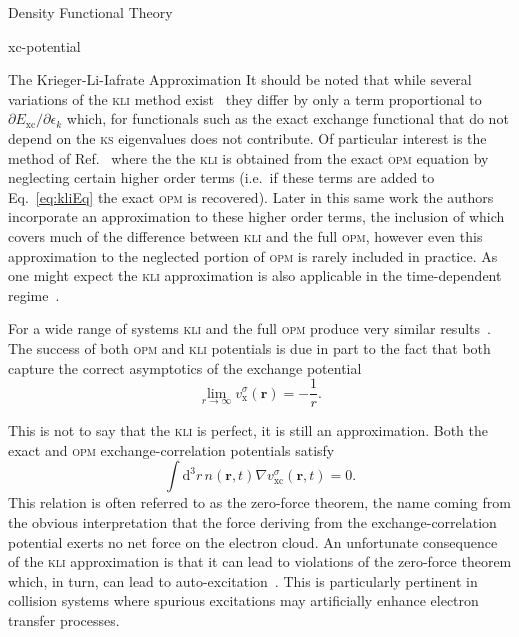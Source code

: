 \documentclass[a5paper, 9 pt]{extreport}
\begin{document}
\begin{chapter}{Density Functional Theory \label{chap:dft}}
\begin{section}{xc-potential \label{sec:xcpot}}
\begin{subsection}{The Krieger-Li-Iafrate Approximation \label{sec:kli}}
         It should be noted that while several variations of the \textsc{kli} method exist~\cite{kli1,
         kli2, kli3} they differ by only a term proportional to $\partial E_\mathrm{xc} / \partial
         \epsilon_k$ which, for functionals such as the exact exchange functional that do not depend on
         the \textsc{ks} eigenvalues does not contribute. Of particular interest is the method of
         Ref.~\cite{kli2} where the the \textsc{kli} is obtained from the exact \textsc{opm} equation by
         neglecting certain higher order terms (i.e.\ if these terms are added to Eq.~\eqref{eq:kliEq}
         the exact \textsc{opm} is recovered). Later in this same work the authors incorporate an
         approximation to these higher order terms, the inclusion of which covers much of the difference
         between \textsc{kli} and the full \textsc{opm}, however even this approximation to the
         neglected portion of \textsc{opm} is rarely included in practice. As one might expect the
         \textsc{kli} approximation is also applicable in the time-dependent regime~\cite{tdkli1,
         tdkli2, tdkli3}.

         For a wide range of systems \textsc{kli} and the full \textsc{opm} produce very similar
         results~\cite{opm-rev}. The success of both \textsc{opm} and \textsc{kli} potentials is due in
         part to the fact that both capture the correct asymptotics of the exchange potential
         \begin{equation}
            \lim\limits_{r \rightarrow \infty} v_\mathrm{x}^\sigma (\mathbf{r}) = -\frac{1}{r}.
         \end{equation}

         This is not to say that the \textsc{kli} is perfect, it is still an approximation. Both the
         exact and \textsc{opm} exchange-correlation potentials satisfy
         \begin{equation} \label{eq:zft}
            \int \mathrm{d}^3 r \, n(\mathbf{r}, t) \nabla v^\sigma_\mathrm{xc}(\mathbf{r},t) = 0.
         \end{equation}
         This relation is often referred to as the zero-force theorem, the name coming from the obvious
         interpretation that the force deriving from the exchange-correlation potential exerts no net
         force on the electron cloud. An unfortunate consequence of the \textsc{kli} approximation is
         that it can lead to violations of the zero-force theorem which, in turn, can lead to
         auto-excitation~\cite{kli-zero-force}. This is particularly pertinent in collision systems
         where spurious excitations may artificially enhance electron transfer processes.

      \end{subsection}

   \end{section}

\end{chapter}
\end{document}
